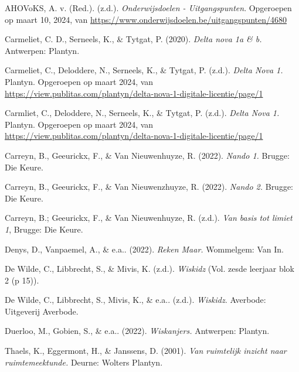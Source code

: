 \begin{bronnen}
    \item AHOVoKS, A. v. (Red.). (z.d.). \emph{Onderwijsdoelen - Uitgangspunten}. Opgeroepen op maart 10, 2024, van \url{https://www.onderwijsdoelen.be/uitgangspunten/4680}
    \item Carmeliet, C. D., Serneels, K., \& Tytgat, P. (2020). \emph{Delta nova 1a \& b.} Antwerpen: Plantyn.
    \item Carmeliet, C., Deloddere, N., Serneels, K., \& Tytgat, P. (z.d.). \emph{Delta Nova 1.} Plantyn. Opgeroepen op maart 2024, van \url{https://view.publitas.com/plantyn/delta-nova-1-digitale-licentie/page/1}
    \item Carmliet, C., Deloddere, N., Serneels, K., \& Tytgat, P. (z.d.). \emph{Delta Nova 1.} Plantyn. Opgeroepen op maart 2024, van \url{https://view.publitas.com/plantyn/delta-nova-1-digitale-licentie/page/1}
    \item Carreyn, B., Geeurickx, F., \& Van Nieuwenhuyze, R. (2022). \emph{Nando 1.} Brugge: Die Keure.
    \item Carreyn, B., Geeurickx, F., \& Van Nieuwenzhuyze, R. (2022). \emph{Nando 2.} Brugge: Die Keure.
    \item Carreyn, B.; Geeurickx, F., \& Van Nieuwenhuyze, R. (z.d.). \emph{Van basis tot limiet 1}, Brugge: Die Keure.
    \item Denys, D., Vanpaemel, A., \& e.a.. (2022). \emph{Reken Maar.} Wommelgem: Van In.
    \item De Wilde, C., Libbrecht, S., \& Mivis, K. (z.d.). \emph{Wiskidz} (Vol. zesde leerjaar blok 2 (p 15)).
    \item De Wilde, C., Libbrecht, S., Mivis, K., \& e.a.. (z.d.). \emph{Wiskidz.} Averbode: Uitgeverij Averbode.
    \item Duerloo, M., Gobien, S., \& e.a.. (2022). \emph{Wiskanjers.} Antwerpen: Plantyn.
    \item Thaels, K., Eggermont, H., \& Janssens, D. (2001). \emph{Van ruimtelijk inzicht naar ruimtemeektunde.} Deurne: Wolters Plantyn.
\end{bronnen}